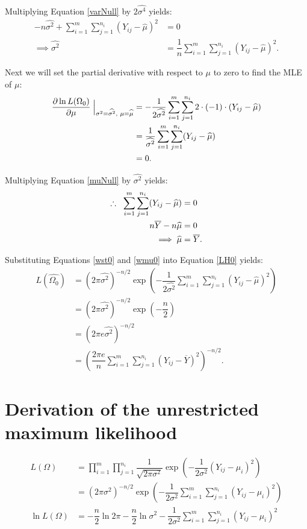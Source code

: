 \documentclass[12pt,a4paper,openright]{article}
\newcommand{\eqn}[1]{Equation \ref{#1}}
\newcommand{\ovY}{\overline{Y}}
\newcommand{\wmu}{\widehat{\mu}}
\newcommand{\wst}{\widehat{\sigma^2}}
\begin{document}
	Multiplying \eqn{varNull} by $2\widehat{\sigma^4}$ yields:
	\begin{align}
		-n\wst + \sum_{i=1}^m \sum_{j=1}^{n_i} (Y_{ij}-\wmu)^2 &= 0\nonumber\\
		\implies \wst &= \dfrac{1}{n} \sum_{i=1}^m \sum_{j=1}^{n_i} (Y_{ij}-\hat{\mu})^2. \label{wst0}
	\end{align}

	Next we will set the partial derivative with respect to $\mu$ to zero to find the MLE of $\mu$:
	\begin{align}
		\dfrac{\partial \ln{L(\Omega_0)}}{\partial \mu} \Bigm\lvert_{\sigma^2 = \wst, \hspace{0.1cm}\mu=\wmu} &= -\dfrac{1}{2\wst} \sum_{i=1}^m \sum_{j=1}^{n_i} 2\cdot (-1)\cdot (Y_{ij}-\wmu) \nonumber\\
		&= \dfrac{1}{\wst} \sum_{i=1}^m \sum_{j=1}^{n_i} (Y_{ij}-\wmu) \nonumber\\
		&= 0. \label{muNull}
	\end{align}

	Multiplying \eqn{muNull} by $\wst$ yields:
	\begin{align}
		\therefore \hspace{0.2cm} \sum_{i=1}^m \sum_{j=1}^{n_i} (Y_{ij}-\wmu) &= 0 \nonumber\\
		n\ovY - n\wmu &= 0 \nonumber \\
		\implies \wmu &= \ovY. \label{wmu0}
	\end{align}

	Substituting Equations \ref{wst0} and \ref{wmu0} into \eqn{LH0} yields:
	\begin{align}
		L(\widehat{\Omega_0}) &= (2\pi\wst)^{-n/2} \exp{\left(-\dfrac{1}{2\wst} \sum_{i=1}^m \sum_{j=1}^{n_i} (Y_{ij}-\wmu)^2\right)} \nonumber\\
		&= (2\pi \wst)^{-n/2} \exp\left(-\dfrac{n}{2}\right) \nonumber \\
		&= (2\pi e\wst)^{-n/2} \nonumber \\
		&= \left(\dfrac{2\pi e}{n} \sum_{i=1}^m \sum_{j=1}^{n_i} (Y_{ij}-\ovY)^2\right)^{-n/2}.\label{MLE0}
	\end{align}

	\section{Derivation of the unrestricted maximum likelihood}
	\begin{align}
		L(\Omega) &= \prod_{i=1}^m \prod_{j=1}^{n_i} \dfrac{1}{\sqrt{2\pi \sigma^2}} \exp{\left(-\dfrac{1}{2\sigma^2} (Y_{ij}-\mu_i)^2\right)} \nonumber\\
		&= (2\pi \sigma^2)^{-n/2} \exp{\left(-\dfrac{1}{2\sigma^2}\sum_{i=1}^m \sum_{j=1}^{n_i} (Y_{ij}-\mu_i)^2\right)} \label{Lu}\\
		\ln{L(\Omega)} &= -\dfrac{n}{2}\ln{2\pi} - \dfrac{n}{2} \ln{\sigma^2} - \dfrac{1}{2\sigma^2} \sum_{i=1}^m \sum_{j=1}^{n_i} (Y_{ij}-\mu_i)^2 \nonumber
	\end{align}
\end{document}
